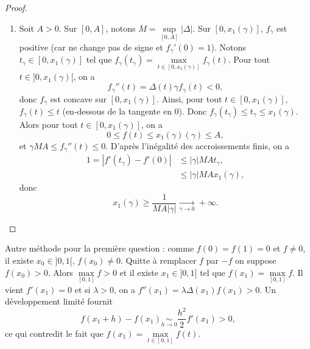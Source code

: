 \documentclass[12pt]{article}
\begin{document}
\begin{proof}
\begin{enumerate}
		\item Soit $A>0$. Sur $[0,A]$, notons $M=\sup\limits_{[0,A]}\left\lvert \Delta\right\rvert$. Sur $[0,x_{1}(\gamma)]$, $f_{\gamma}$ est positive (car ne change pas de signe et $f_{\gamma}'(0)=1$). Notons $t_{\gamma}\in[0,x_{1}(\gamma)]$ tel que $f_{\gamma}(t_{\gamma})=\max\limits_{t\in[0,x_{1}(\gamma)]}f_{\gamma}(t)$. Pour tout $t\in]0,x_{1}(\gamma)[$, on a 
		\begin{equation}
			f_{\gamma}''(t)=\Delta(t)\gamma f_{\gamma}(t)<0,
		\end{equation}
		donc $f_{\gamma}$ est concave sur $[0,x_{1}(\gamma)]$. Ainsi, pour tout $t\in[0,x_{1}(\gamma)]$, $f_{\gamma}(t)\leqslant t$ (en-dessous de la tangente en 0). Donc $f_{\gamma}(t_{\gamma})\leqslant t_{\gamma}\leqslant x_{1}(\gamma)$. Alors pour tout $t\in[0,x_{1}(\gamma)]$, on a 
		\begin{equation}
			0\leqslant f(t)\leqslant x_1(\gamma)(\gamma)\leqslant A,
		\end{equation}
		et $\gamma MA\leqslant f_{\gamma}''(t)\leqslant0$. D'après l'inégalité des accroissements finis, on a 
		\begin{align}
			1=\left\lvert f'(t_{\gamma})-f'(0)\right\rvert
			&\leqslant\left\lvert\gamma\right\rvert MAt_{\gamma},\\
			&\leqslant\left\lvert\gamma\right\rvert MAx_{1}(\gamma),
		\end{align}
		donc 
		\begin{equation}
			x_{1}(\gamma)\geqslant\frac{1}{MA\left\lvert\gamma\right\rvert}\xrightarrow[\gamma\to0]{}+\infty.
		\end{equation}
	\end{enumerate}
\end{proof}

\begin{remark}
	Autre méthode pour la première question : comme $f(0)=f(1)=0$ et $f\neq0$, il existe $x_0\in]0,1[$, $f(x_0)\neq0$. Quitte à remplacer $f$ par $-f$ on suppose $f(x_0)>0$. Alors $\max\limits_{[0,1]}f>0$ et il existe $x_1\in]0,1[$ tel que $f(x_1)=\max\limits_{[0,1]}f$. Il vient $f'(x_1)=0$ et si $\lambda>0$, on a $f''(x_1)=\lambda\Delta(x_1)f(x_1)>0$. Un développement limité fournit 
	\begin{equation}
		f(x_1+h)-f(x_1)\underset{h\to0}{\sim}\frac{h^{2}}{2}f'(x_1)>0,
	\end{equation}
	ce qui contredit le fait que $f(x_1)=\max\limits_{t\in[0,1]}f(t)$.
\end{remark}
\end{document}
